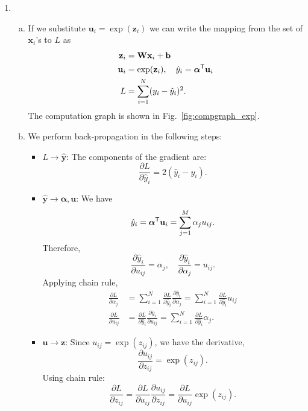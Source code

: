 \documentclass[11pt]{article}
\def\arr{\rightarrow}
\newcommand{\bbf}{\mathbf{b}}
\newcommand{\ubf}{\mathbf{u}}
\newcommand{\xbf}{\mathbf{x}}
\newcommand{\ybf}{\mathbf{y}}
\newcommand{\zbf}{\mathbf{z}}
\newcommand{\Wbf}{\mathbf{W}}
\def\alphabf{{\boldsymbol \alpha}}
\newcommand{\tran}{^{\text{\sf T}}}
\begin{document}
\begin{enumerate}
\item

\begin{enumerate}[(a)]
\item If we substitute $\ubf_i = \exp(\zbf_i)$ we can write the mapping from
the set of $\xbf_i$'s to $L$ as
\begin{align*}
    \zbf_i    &= \Wbf\xbf_i + \bbf \\
    \ubf_i &= \exp(\zbf_i), \quad \hat{y}_i = \alphabf\tran \ubf_i \\
    L &= \sum_{i=1}^N (y_i-\hat{y}_i)^2.
\end{align*}
The computation graph is shown in Fig.~\ref{fig:compgraph_exp}.

\item We perform back-propagation in the following steps:
\begin{itemize}
\item $L \arr \hat{\ybf}$:  The components of the gradient are:
\[
    \frac{\partial L}{\partial \hat{y}_i} = 2(\hat{y}_i - y_i).
\]

\item $\hat{\ybf} \arr \alphabf, \ubf$:  We have
\[
    \hat{y}_i = \alphabf\tran \ubf_i = \sum_{j=1}^M \alpha_ju_{ij}.
\]
Therefore,
\[
    \frac{\partial \hat{y}_i}{\partial u_{ij}} = \alpha_j, \quad
    \frac{\partial \hat{y}_i}{\partial \alpha_j} = u_{ij}.
\]
Applying chain rule,
\begin{align*}
    \frac{\partial L}{\partial \alpha_j} &= \sum_{i=1}^N
    \frac{\partial L}{\partial \hat{y}_i}\frac{\partial \hat{y}_i}{\partial \alpha_j}
    = \sum_{i=1}^N  \frac{\partial L}{\partial \hat{y}_i}u_{ij} \\
    \frac{\partial L}{\partial u_{ij}} &=
    \frac{\partial L}{\partial \hat{y}_i}\frac{\partial \hat{y}_i}{\partial u_{ij}}
    = \sum_{i=1}^N  \frac{\partial L}{\partial \hat{y}_i}\alpha_j.
\end{align*}

\item $\ubf \arr \zbf$: Since $u_{ij} = \exp(z_{ij})$, we have the derivative,
\[
    \frac{\partial u_{ij}}{\partial z_{ij}} = \exp(z_{ij}).
\]
Using chain rule:
\[
    \frac{\partial L}{\partial z_{ij}} = \frac{\partial L}{\partial u_{ij}}\frac{\partial u_{ij}}{\partial z_{ij}}
    = \frac{\partial L}{\partial u_{ij}}\exp(z_{ij}).
\]


\end{itemize}
\end{enumerate}
\end{enumerate}
\end{document}
